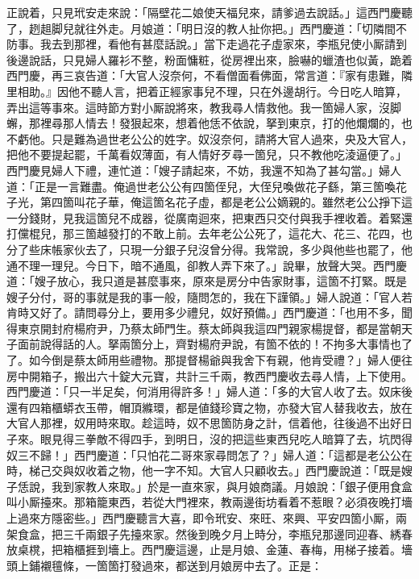正說着，只見玳安走來說：「隔壁花二娘使天福兒來，請爹過去說話。」這西門慶聽了，趔趄脚兒就往外走。月娘道：「明日沒的教人扯你把。」西門慶道：「切隣間不防事。我去到那裡，看他有甚麼話說。」當下走過花子虛家來，李瓶兒使小厮請到後邊說話，只見婦人羅衫不整，粉面慵粧，從房裡出來，臉嚇的蠟渣也似黃，跪着西門慶，再三哀告道：「大官人沒奈何，不看僧面看佛面，{}常言道：『家有患難，隣里相助。』因他不聽人言，把着正經家事兒不理，只在外邊胡行。今日吃人暗算，弄出這等事來。這時節方對小厮說將來，教我尋人情救他。我一箇婦人家，沒脚蠏，那裡尋那人情去！發狠起來，想着他恁不依說，拏到東京，打的他爛爛的，也不虧他。{}只是難為過世老公公的姓字。奴沒奈何，請將大官人過來，央及大官人，把他不要提起罷，千萬看奴薄面，有人情好歹尋一箇兒，只不教他吃淩逼便了。」西門慶見婦人下禮，連忙道：「嫂子請起來，不妨，我還不知為了甚勾當。」婦人道：「正是一言難盡。俺過世老公公有四箇侄兒，大侄兒喚做花子繇，第三箇喚花子光，第四箇叫花子華，俺這箇名花子虛，都是老公公嫡親的。雖然老公公掙下這一分錢財，見我這箇兒不成器，從廣南迴來，把東西只交付與我手裡收着。着緊還打儻棍兒，那三箇越發打的不敢上前。去年老公公死了，這花大、花三、花四，也分了些床帳家伙去了，只現一分銀子兒沒曾分得。我常說，多少與他些也罷了，他通不理一理兒。今日下，暗不通風，卻教人弄下來了。」說畢，放聲大哭。西門慶道：「嫂子放心，我只道是甚麼事來，原來是房分中告家財事，這箇不打緊。既是嫂子分付，哥的事就是我的事一般，隨問怎的，我在下謹領。」婦人說道：「官人若肯時又好了。請問尋分上，要用多少禮兒，奴好預備。」西門慶道：「也用不多，聞得東京開封府楊府尹，乃蔡太師門生。蔡太師與我這四門親家楊提督，都是當朝天子面前說得話的人。拏兩箇分上，齊對楊府尹說，有箇不依的！不拘多大事情也了了。如今倒是蔡太師用些禮物。那提督楊爺與我舍下有親，他肯受禮？」婦人便往房中開箱子，搬出六十錠大元寶，共計三千兩，教西門慶收去尋人情，上下使用。西門慶道：「只一半足矣，何消用得許多！」婦人道：「多的大官人收了去。奴床後還有四箱櫃蟒衣玉帶，帽頂縧環，都是値錢珍寶之物，亦發大官人替我收去，放在大官人那裡，奴用時來取。{}趁這時，奴不思箇防身之計，信着他，往後過不出好日子來。眼見得三拳敵不得四手，到明日，沒的把這些東西兒吃人暗算了去，坑閃得奴三不歸！」西門慶道：「只怕花二哥來家尋問怎了？」婦人道：「這都是老公公在時，梯己交與奴收着之物，他一字不知。大官人只顧收去。」西門慶說道：「既是嫂子恁說，我到家教人來取。」於是一直來家，與月娘商議。月娘說：「銀子便用食盒叫小厮擡來。那箱籠東西，若從大門裡來，教兩邊街坊看着不惹眼？必須夜晚打墻上過來方隱密些。」西門慶聽言大喜，即令玳安、來旺、來興、平安四箇小厮，兩架食盒，把三千兩銀子先擡來家。然後到晚夕月上時分，李瓶兒那邊同迎春、綉春放桌櫈，把箱櫃捱到墻上。西門慶這邊，止是月娘、金蓮、春梅，用梯子接着。墻頭上鋪襯氊條，一箇箇打發過來，都送到月娘房中去了。正是：

